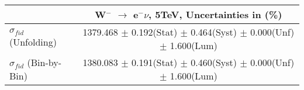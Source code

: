 \documentclass[12pt]{article}
\begin{document}
\begin{table}[ht]
\begin{tabular}{c|c|}
\cline{2-2}
                                                           &    W$^{-}$ $\rightarrow$ e$^{-} \nu $, 5TeV, Uncertainties in (\%)  \\ \hline 
\multicolumn{1}{|l|}{$\sigma_{fid}$ (Unfolding)}         &    1379.468   $\pm$ 0.192(Stat) $\pm$ 0.464(Syst) $\pm$ 0.000(Unf) $\pm$ 1.600(Lum)     \\ \hline 
\multicolumn{1}{|l|}{$\sigma_{fid}$ (Bin-by-Bin)}        &    1380.083   $\pm$ 0.191(Stat) $\pm$ 0.460(Syst) $\pm$ 0.000(Unf) $\pm$ 1.600(Lum)     \\ \hline 
\end{tabular}
\end{table}
\end{document}
